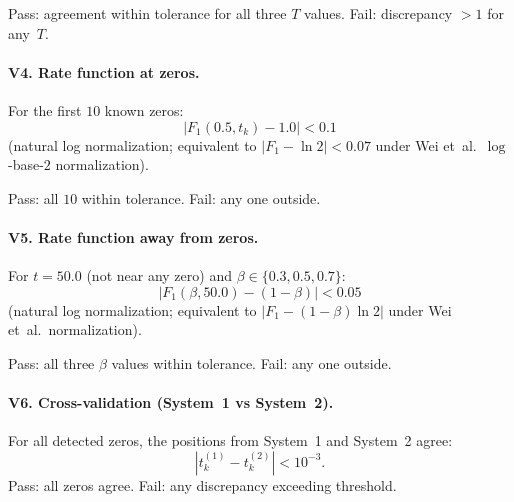 Pass: agreement within tolerance for all three $T$ values. Fail: discrepancy $> 1$ for
any~$T$.

\paragraph{V4. Rate function at zeros.}
For the first $10$ known zeros:
\begin{equation}\label{eq:V4}
  |F_1(0.5, t_k) - 1.0| < 0.1
\end{equation}
(natural log normalization; equivalent to $|F_1 - \ln 2| < 0.07$ under Wei et~al.\
$\log$-base-$2$ normalization).

Pass: all $10$ within tolerance. Fail: any one outside.

\paragraph{V5. Rate function away from zeros.}
For $t = 50.0$ (not near any zero) and $\beta \in \{0.3, 0.5, 0.7\}$:
\begin{equation}\label{eq:V5}
  |F_1(\beta, 50.0) - (1 - \beta)| < 0.05
\end{equation}
(natural log normalization; equivalent to $|F_1 - (1 - \beta)\ln 2|$ under Wei et~al.\
normalization).

Pass: all three $\beta$ values within tolerance. Fail: any one outside.

\paragraph{V6. Cross-validation (System~1 vs System~2).}
For all detected zeros, the positions from System~1 and System~2 agree:
\begin{equation}\label{eq:V6}
  |t_k^{(1)} - t_k^{(2)}| < 10^{-3}.
\end{equation}
Pass: all zeros agree. Fail: any discrepancy exceeding threshold.

